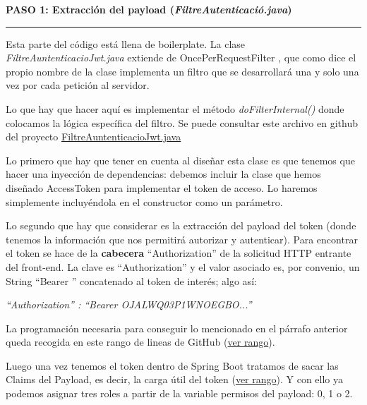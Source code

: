 \documentclass[a4paper,12pt]{report}
\begin{document}
		\noindent \textbf{PASO 1: Extracción del payload (\textit{FiltreAutenticació.java})}
		\hrule
		\vspace{1em}
		
		Esta parte del código está llena de boilerplate. La clase \textit{FiltreAuntenticacioJwt.java} extiende de OncePerRequestFilter \cite{oncePerRequestFilter}, que como dice el propio nombre de la clase implementa un filtro que se desarrollará una y solo una vez por cada petición al servidor.
		
		Lo que hay que hacer aquí es implementar el método \textit{doFilterInternal()} donde colocamos la lógica específica del filtro. Se puede consultar este archivo en github del proyecto \href{https://github.com/blackcub3s/mercApp/blob/main/APP%20WEB/__springboot__produccio__/app/src/main/java/miApp/app/seguretat/FiltreAutenticacioJwt.java}{FiltreAuntenticacioJwt.java}
		
		Lo primero que hay que tener en cuenta al diseñar esta clase es que tenemos que hacer una inyección de dependencias: debemos incluir la clase que hemos diseñado AccessToken para implementar el token de acceso. Lo haremos simplemente incluyéndola en el constructor como un parámetro.
		
		Lo segundo que hay que considerar es la extracción del payload del token (donde tenemos la información que nos permitirá autorizar y autenticar). Para encontrar el token se hace de la \textbf{cabecera} ``Authorization'' de la solicitud HTTP entrante del front-end. La clave es ``Authorization'' y el valor asociado es, por convenio, un String ``Bearer '' concatenado al token de interés; algo así:
		

		
		\FloatBarrier
		\begin{table}[h]
				\centering
 				\textit{``Authorization'' : ``Bearer OJALWQ03P1WNOEGBO...''}
		\end{table}
		\FloatBarrier
		

		 
		  La programación necesaria para conseguir lo mencionado en el párrafo anterior queda recogida en este rango de lineas de GitHub (\href{https://github.com/blackcub3s/mercApp/blob/89efcf854d8bbab2addde3f7e817eb97f7737b95/APP%20WEB/__springboot__produccio__/app/src/main/java/miApp/app/seguretat/FiltreAutenticacioJwt.java#L33-L43}{ver rango}). 
		  
		  Luego una vez tenemos el token dentro de Spring Boot tratamos de sacar las Claims del Payload, es decir, la carga útil del token (\href{https://github.com/blackcub3s/mercApp/blob/89efcf854d8bbab2addde3f7e817eb97f7737b95/APP%20WEB/__springboot__produccio__/app/src/main/java/miApp/app/seguretat/FiltreAutenticacioJwt.java#L50-L54}{ver rango}). Y con ello ya podemos asignar tres roles a partir de la variable permisos del payload: 0, 1 o 2. 
		  
\end{document}
